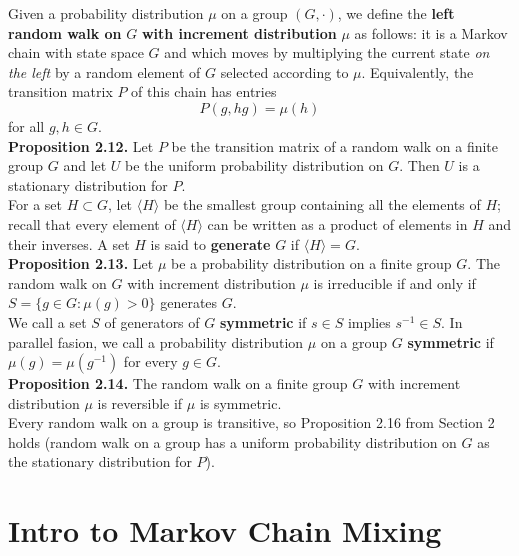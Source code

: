 \documentclass[12pt]{article}
\begin{document}
Given a probability distribution $\mu$ on a group $(G, \cdot)$, we define the \textbf{left random walk on} $G$ \textbf{with increment distribution} $\mu$ as follows: it is a Markov chain with state space $G$ and which moves by multiplying the current state \textit{on the left} by a random element of $G$ selected according to $\mu$. Equivalently, the transition matrix $P$ of this chain has entries $$P(g, hg) = \mu(h)$$ for all $g, h \in G$.\\

\textbf{Proposition 2.12.} Let $P$ be the transition matrix of a random walk on a finite group $G$ and let $U$ be the uniform probability distribution on $G$. Then $U$ is a stationary distribution for $P$.\\

For a set $H \subset G$, let $\langle H \rangle$ be the smallest group containing all the elements of $H$; recall that every element of $\langle H \rangle$ can be written as a product of elements in $H$ and their inverses. A set $H$ is said to \textbf{generate} $G$ if $\langle H \rangle = G$.\\

\textbf{Proposition 2.13.} Let $\mu$ be a probability distribution on a finite group $G$. The random walk on $G$ with increment distribution $\mu$ is irreducible if and only if $S = \{g \in G: \mu(g) > 0\}$ generates $G$.\\

We call a set $S$ of generators of $G$ \textbf{symmetric} if $s \in S$ implies $s^{-1} \in S$. In parallel fasion, we call a probability distribution $\mu$ on a group $G$ \textbf{symmetric} if $\mu(g) = \mu(g^{-1})$ for every $g \in G$.\\

\textbf{Proposition 2.14.} The random walk on a finite group $G$ with increment distribution $\mu$ is reversible if $\mu$ is symmetric.\\

Every random walk on a group is transitive, so Proposition 2.16 from Section 2 holds (random walk on a group has a uniform probability distribution on $G$ as the stationary distribution for $P$).




\section{Intro to Markov Chain Mixing}
\end{document}
